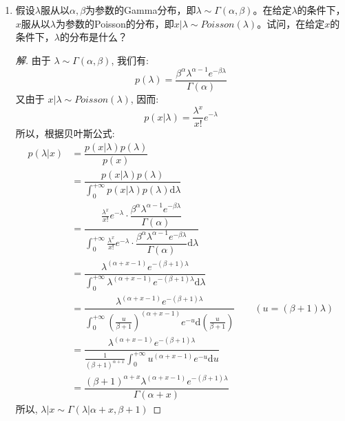 \documentclass[12pt]{article}
\newcommand{\hei}{\CJKfamily{hei}}                          %
\begin{document}
\begin{enumerate}
\item {\hei 假设$\lambda$服从以$\alpha,\beta$为参数的Gamma分布，即$\lambda\sim \Gamma(\alpha,\beta)$。在给定$\lambda$的条件下，$x$服从以$\lambda$为参数的Poisson的分布，即$x|\lambda\sim Poisson(\lambda)$。试问，在给定$x$的条件下，$\lambda$的分布是什么？}
\begin{proof}[解]
	由于 $\lambda \sim \Gamma(\alpha,\beta)$, 我们有:
	\begin{equation}
	p(\lambda)=\dfrac{\beta^{\alpha}\lambda^{\alpha-1}e^{-\beta\lambda}}{\Gamma(\alpha)}
	\end{equation}
	又由于 $x|\lambda \sim Poisson(\lambda)$, 因而:
	\begin{equation}
	p(x|\lambda)=\frac{\lambda^x}{x!}e^{-\lambda}
	\end{equation}
	所以，根据贝叶斯公式:
	\begin{equation}
	\begin{aligned}
	p(\lambda|x)&=\dfrac{p(x|\lambda)p(\lambda)}{p(x)} \\
	&=\dfrac{p(x|\lambda)p(\lambda)}{\int_{0}^{+\infty}p(x|\lambda)p(\lambda)\mathrm{d}\lambda} \\
	&=\dfrac{\frac{\lambda^x}{x!}e^{-\lambda}\cdot\dfrac{\beta^{\alpha}\lambda^{\alpha-1}e^{-\beta\lambda}}{\Gamma(\alpha)}}{\int_{0}^{+\infty}\frac{\lambda^x}{x!}e^{-\lambda}\cdot\dfrac{\beta^{\alpha}\lambda^{\alpha-1}e^{-\beta\lambda}}{\Gamma(\alpha)}\mathrm{d}\lambda} \\
	&=\dfrac{\lambda^{(\alpha+x-1)}e^{-(\beta+1)\lambda}}{\int_{0}^{+\infty}\lambda^{(\alpha+x-1)}e^{-(\beta+1)\lambda}\mathrm{d}\lambda} \\
	&=\dfrac{\lambda^{(\alpha+x-1)}e^{-(\beta+1)\lambda}}{\int_{0}^{+\infty}\left(\frac{u}{\beta+1}\right)^{(\alpha+x-1)}e^{-u}\mathrm{d}\left(\frac{u}{\beta+1}\right)} \qquad (u=(\beta+1)\lambda) \\
	&=\dfrac{\lambda^{(\alpha+x-1)}e^{-(\beta+1)\lambda}}{\frac{1}{(\beta+1)^{\alpha+x}}\int_{0}^{+\infty}u^{(\alpha+x-1)}e^{-u}\mathrm{d}u} \\
	&=\dfrac{(\beta+1)^{\alpha+x}\lambda^{(\alpha+x-1)}e^{-(\beta+1)\lambda}}{\Gamma(\alpha+x)}
	\end{aligned}
	\end{equation}
	所以, $\lambda|x \sim \Gamma(\lambda|\alpha+x,\beta+1)$
\end{proof}


\end{enumerate}
\end{document}
